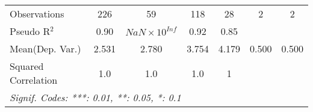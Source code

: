 \begin{tabular}{lcccccc}
   Observations                                            & 226       & 59                     & 118           & 28           & 2    & 2\\  
   Pseudo R$^2$                                            & 0.90      & $NaN\times 10^{Inf}$   & 0.92          & 0.85         &      & \\  
Mean(Dep. Var.) & 2.531 & 2.780 & 3.754 & 4.179 & 0.500 & 0.500 \\
   Squared Correlation                                     & 1.0       & 1.0                    & 1.0           & 1            &      & \\  
   \midrule \midrule
   \multicolumn{7}{l}{\emph{Signif. Codes: ***: 0.01, **: 0.05, *: 0.1}}\\
\end{tabular}
\par\endgroup
